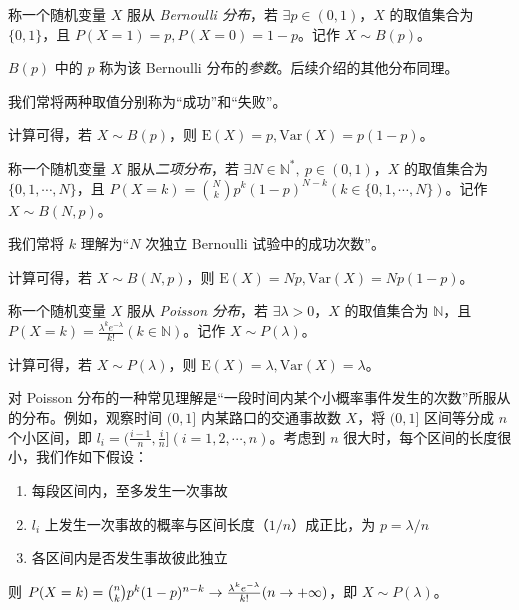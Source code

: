 \documentclass[../main.tex]{subfiles}
\begin{document}
\begin{definition}\label{def:2.3.1}
    称一个随机变量 $X$ 服从 \emph{Bernoulli 分布}，若 $\exists p\in(0,1)$，$X$ 的取值集合为 $\{0,1\}$，且 $P(X=1)=p,P(X=0)=1-p$。记作 $X\sim B(p)$。
\end{definition}

$B(p)$ 中的 $p$ 称为该 Bernoulli 分布的\emph{参数}。后续介绍的其他分布同理。

我们常将两种取值分别称为“成功”和“失败”。

计算可得，若 $X\sim B(p)$，则 $\mathrm{E}(X)=p,\mathrm{Var}(X)=p(1-p)$。

\begin{definition}\label{def:2.3.2}
    称一个随机变量 $X$ 服从\emph{二项分布}，若 $\exists N\in\mathbb{N}^*,\ p\in(0,1)$，$X$ 的取值集合为 $\{0,1,\cdots,N\}$，且 $P(X=k)=\binom{N}{k}p^k(1-p)^{N-k}(k\in\{0,1,\cdots,N\})$。记作 $X\sim B(N,p)$。
\end{definition}

我们常将 $k$ 理解为“$N$ 次独立 Bernoulli 试验中的成功次数”。

计算可得，若 $X\sim B(N,p)$，则 $\mathrm{E}(X)=Np,\mathrm{Var}(X)=Np(1-p)$。

\begin{definition}\label{def:2.3.3}
    称一个随机变量 $X$ 服从 \emph{Poisson 分布}，若 $\exists\lambda>0$，$X$ 的取值集合为 $\mathbb{N}$，且 $P(X=k)=\frac{\lambda^ke^{-\lambda}}{k!}(k\in\mathbb{N})$。记作 $X\sim P(\lambda)$。
\end{definition}

计算可得，若 $X\sim P(\lambda)$，则 $\mathrm{E}(X)=\lambda,\mathrm{Var}(X)=\lambda$。

对 Poisson 分布的一种常见理解是“一段时间内某个小概率事件发生的次数”所服从的分布。例如，观察时间 $(0,1]$ 内某路口的交通事故数 $X$，将 $(0,1]$ 区间等分成 $n$ 个小区间，即 $l_i=(\frac{i-1}{n},\frac{i}{n}](i=1,2,\cdots,n)$。考虑到 $n$ 很大时，每个区间的长度很小，我们作如下假设：
\begin{enumerate}
    \item 每段区间内，至多发生一次事故
    \item $l_i$ 上发生一次事故的概率与区间长度（$1/n$）成正比，为 $p=\lambda/n$
    \item 各区间内是否发生事故彼此独立
\end{enumerate}

则 $P(X=k)=\tbinom{n}{k}p^k(1-p)^{n-k}\rightarrow \frac{\lambda^ke^{-\lambda}}{k!}(n\rightarrow+\infty)$，即 $X\sim P(\lambda)$。
\end{document}
